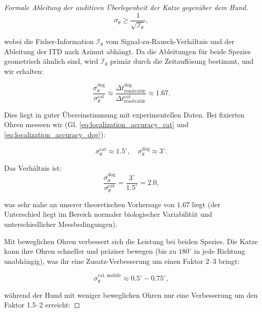 ﻿\documentclass[12pt, a4paper]{article}
\theoremstyle{definition}
\theoremstyle{remark}
\begin{document}
\begin{proof}[Formale Ableitung der auditiven Überlegenheit der Katze gegenüber dem Hund]
\begin{equation}
\sigma_\theta \geq \frac{1}{\sqrt{\mathcal{I}_\theta}},
\label{eq:localization_error_cramer_rao}
\end{equation}

wobei die Fisher-Information $\mathcal{I}_\theta$ vom Signal-zu-Rausch-Verhältnis und der Ableitung der ITD nach Azimut abhängt. Da die Ableitungen für beide Spezies geometrisch ähnlich sind, wird $\mathcal{I}_\theta$ primär durch die Zeitauflösung bestimmt, und wir erhalten:

\begin{equation}
\frac{\sigma_\theta^{\mathrm{dog}}}{\sigma_\theta^{\mathrm{cat}}} \approx \frac{\Delta t_{\text{resolvable}}^{\mathrm{dog}}}{\Delta t_{\text{resolvable}}^{\mathrm{cat}}} \approx 1.67.
\label{eq:localization_error_ratio_itd}
\end{equation}

Dies liegt in guter Übereinstimmung mit experimentellen Daten. Bei fixierten Ohren messsen wir (Gl. \ref{eq:localization_accuracy_cat} und \ref{eq:localization_accuracy_dog}):

\begin{equation}
\sigma_\theta^{\mathrm{cat}} \approx 1.5^{\circ}, \quad \sigma_\theta^{\mathrm{dog}} \approx 3^{\circ}.
\label{eq:experimental_localization_fixed}
\end{equation}

Das Verhältnis ist:
\begin{equation}
\frac{\sigma_\theta^{\mathrm{dog}}}{\sigma_\theta^{\mathrm{cat}}} = \frac{3^{\circ}}{1.5^{\circ}} = 2.0,
\label{eq:localization_ratio_fixed}
\end{equation}

was sehr nahe an unserer theoretischen Vorhersage von $1.67$ liegt (der Unterschied liegt im Bereich normaler biologischer Variabilität und unterschiedlicher Messbedingungen).

Mit beweglichen Ohren verbessert sich die Leistung bei beiden Spezies. Die Katze kann ihre Ohren schneller und präziser bewegen (bis zu $180^{\circ}$ in jede Richtung unabhängig), was ihr eine Zusatz-Verbesserung um einen Faktor 2--3 bringt:

\begin{equation}
\sigma_\theta^{\mathrm{cat, mobile}} \approx 0.5^{\circ} - 0.75^{\circ},
\label{eq:localization_cat_mobile}
\end{equation}

während der Hund mit weniger beweglichen Ohren nur eine Verbesserung um den Faktor 1.5--2 erreicht:


\end{proof}
\end{document}
